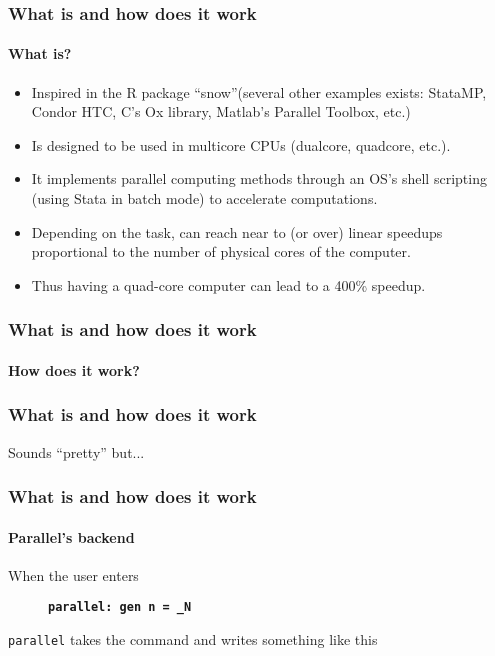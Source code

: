 \documentclass[9pt,handout]{beamer}
\begin{document}
\begin{frame} %
\frametitle{What is and how does it work}
\framesubtitle{What is?}

\begin{itemize}
\item Inspired in the R package ``snow''\pause (several other examples exists: StataMP, Condor HTC, C's Ox library, Matlab's Parallel Toolbox, etc.)\pause
\item Is designed to be used in multicore CPUs (dualcore, quadcore, etc.).\pause
\item It implements parallel computing methods through an OS's shell scripting (using Stata in batch mode) to accelerate computations.\pause
\item Depending on the task, can reach near to (or over) linear speedups proportional to the number of physical cores of the computer.\pause
\item Thus having a quad-core computer can lead to a 400\% speedup.
\end{itemize}

\end{frame}

\begin{frame}[b]
\frametitle{What is and how does it work}
\framesubtitle{How does it work?}
\begin{figure}
\centering
\scalebox{.7}{}
\end{figure}
\end{frame}

\begin{frame}
\frametitle{What is and how does it work}
{\Large Sounds ``pretty'' but...}
\end{frame}

\begin{frame}
\frametitle{What is and how does it work}
\framesubtitle{Parallel's backend}

When the user enters 

\begin{figure}[fragile]
\small
\centering
{\bf{\tt parallel: gen n = \_N}}
\end{figure} 

{\tt parallel} takes the command and writes something like this\pause
\bigskip
\scriptsize


\end{frame}
\end{document}
